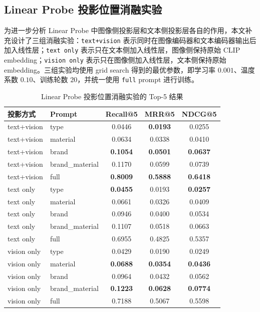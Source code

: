 \documentclass[11pt, a4paper]{ctexart}
\begin{document}
\subsection{Linear Probe 投影位置消融实验}

为进一步分析 Linear Probe 中图像侧投影层和文本侧投影层各自的作用，本文补充设计了三组消融实验：\texttt{text+vision} 表示同时在图像编码器和文本编码器输出后加入线性层；\texttt{text only} 表示只在文本侧加入线性层，图像侧保持原始 CLIP embedding；\texttt{vision only} 表示只在图像侧加入线性层，文本侧保持原始 embedding。三组实验均使用 grid search 得到的最优参数，即学习率 $0.001$、温度系数 $0.10$、训练轮数 $20$，并统一使用 \texttt{full} prompt 进行训练。

\begin{table}[!htbp]
    \centering
    \caption{Linear Probe 投影位置消融实验的 Top-5 结果}
    \label{tab:linear-ablation-top5}
    \small
    \begin{tabular}{llccc}
        \toprule
        \textbf{投影方式} & \textbf{Prompt} & \textbf{Recall@5} & \textbf{MRR@5} & \textbf{NDCG@5} \\
        \midrule
        text+vision & type & 0.0446 & \textbf{0.0193} & 0.0255 \\
        text+vision & material & 0.0634 & 0.0338 & 0.0410 \\
        text+vision & brand & \textbf{0.1054} & \textbf{0.0501} & \textbf{0.0637} \\
        text+vision & brand\_material & 0.1170 & 0.0599 & 0.0739 \\
        text+vision & full & \textbf{0.8009} & \textbf{0.5888} & \textbf{0.6418} \\
        \midrule
        text only & type & \textbf{0.0455} & 0.0193 & \textbf{0.0257}\\
        text only & material & 0.0661 & 0.0326 & 0.0409 \\
        text only & brand & 0.0946 & 0.0400 & 0.0534 \\
        text only & brand\_material & 0.1107 & 0.0518 & 0.0663 \\
        text only & full & 0.6955 & 0.4825 & 0.5357 \\
        \midrule
        vision only & type & 0.0429 & 0.0190 & 0.0249 \\
        vision only & material & \textbf{0.0688} & \textbf{0.0354} & \textbf{0.0436} \\
        vision only & brand & 0.0964 & 0.0432 & 0.0562 \\
        vision only & brand\_material & \textbf{0.1223} & \textbf{0.0628} & \textbf{0.0774} \\
        vision only & full & 0.7188 & 0.5067 & 0.5598 \\
        \bottomrule
    \end{tabular}
\end{table}
\FloatBarrier
\end{document}
